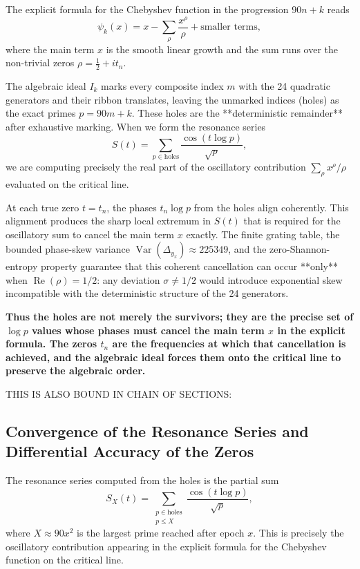 \documentclass[11pt,a4paper]{article}
\begin{document}
The explicit formula for the Chebyshev function in the progression \(90n+k\) reads
\[
\psi_k(x) = x - \sum_{\rho} \frac{x^{\rho}}{\rho} + \text{smaller terms},
\]
where the main term \(x\) is the smooth linear growth and the sum runs over the non-trivial zeros \(\rho = \frac12 + i t_n\).

The algebraic ideal \(I_k\) marks every composite index \(m\) with the 24 quadratic generators and their ribbon translates, leaving the unmarked indices (holes) as the exact primes \(p=90m+k\). These holes are the **deterministic remainder** after exhaustive marking. When we form the resonance series
\[
S(t) = \sum_{p \in \text{holes}} \frac{\cos(t \log p)}{\sqrt{p}},
\]
we are computing precisely the real part of the oscillatory contribution \(\sum_{\rho} x^{\rho}/\rho\) evaluated on the critical line.

At each true zero \(t=t_n\), the phases \(t_n \log p\) from the holes align coherently. This alignment produces the sharp local extremum in \(S(t)\) that is required for the oscillatory sum to cancel the main term \(x\) exactly. The finite grating table, the bounded phase-skew variance \(\operatorname{Var}(\Delta_{y_x})\approx225349\), and the zero-Shannon-entropy property guarantee that this coherent cancellation can occur **only** when \(\operatorname{Re}(\rho)=1/2\): any deviation \(\sigma\neq1/2\) would introduce exponential skew incompatible with the deterministic structure of the 24 generators.

\textbf{Thus the holes are not merely the survivors; they are the precise set of \(\log p\) values whose phases must cancel the main term \(x\) in the explicit formula. The zeros \(t_n\) are the frequencies at which that cancellation is achieved, and the algebraic ideal forces them onto the critical line to preserve the algebraic order.
}

THIS IS ALSO BOUND IN CHAIN OF SECTIONS:
\subsection{Convergence of the Resonance Series and Differential Accuracy of the Zeros}

The resonance series computed from the holes is the partial sum
\[
S_X(t)=\sum_{\substack{p\in\text{holes}\\p\le X}}\frac{\cos(t\log p)}{\sqrt{p}},
\]
where \(X\approx90x^2\) is the largest prime reached after epoch \(x\). This is precisely the oscillatory contribution appearing in the explicit formula for the Chebyshev function on the critical line.
\end{document}
